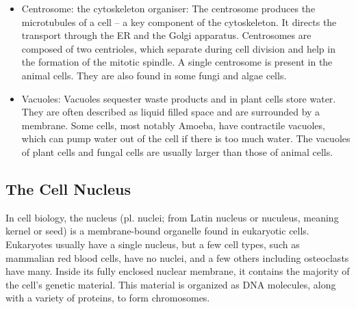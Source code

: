 \begin{itemize}
\item
  Centrosome: the cytoskeleton organiser: The centrosome produces the microtubules of a cell -- a key component of the cytoskeleton. It directs the transport through the ER and the Golgi apparatus. Centrosomes are composed of two centrioles, which separate during cell division and help in the formation of the mitotic spindle. A single centrosome is present in the animal cells. They are also found in some fungi and algae cells.
\item
  Vacuoles: Vacuoles sequester waste products and in plant cells store water. They are often described as liquid filled space and are surrounded by a membrane. Some cells, most notably Amoeba, have contractile vacuoles, which can pump water out of the cell if there is too much water. The vacuoles of plant cells and fungal cells are usually larger than those of animal cells.
\end{itemize}

\hypertarget{the-cell-nucleus}{%
\subsection{The Cell Nucleus}\label{the-cell-nucleus}}

In cell biology, the nucleus (pl. nuclei; from Latin nucleus or nuculeus, meaning kernel or seed) is a membrane-bound organelle found in eukaryotic cells. Eukaryotes usually have a single nucleus, but a few cell types, such as mammalian red blood cells, have no nuclei, and a few others including osteoclasts have many. Inside its fully enclosed nuclear membrane, it contains the majority of the cell's genetic material. This material is organized as DNA molecules, along with a variety of proteins, to form chromosomes.



